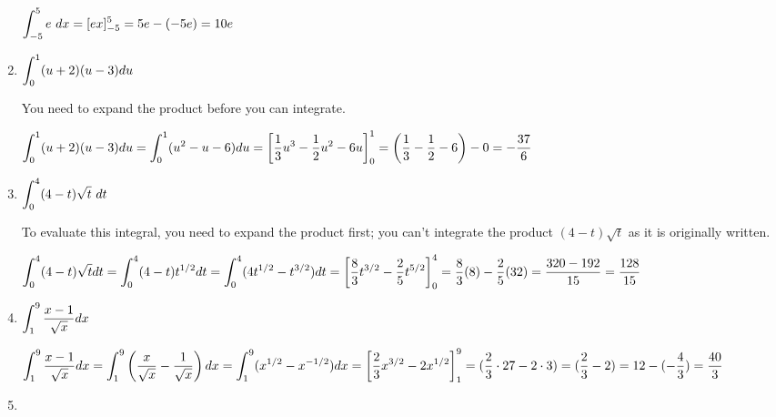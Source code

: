 \begin{enumerate}[1.]
\begin{Solution}
    $\displaystyle \int_{-5}^5 e ~dx = [e x]_{-5}^5 = 5e - (-5e) = 10e$
    
\end{Solution}

\item \begin{Question}
    
  $\displaystyle \int_0^1 (u + 2)(u - 3) du$
\end{Question}

\begin{Solution}
  You need to expand the product before you can integrate.  

    $\displaystyle \int_0^1 (u + 2)(u - 3) du = \int_0^1 (u^2 - u - 6) du = \left[
      \frac{1}{3} u^3 - \frac{1}{2} u^2 - 6u \right]_0^1 =
    \left(\frac{1}{3} - \frac{1}{2} - 6 \right) - 0 = - \frac{37}{6}$
\end{Solution}


  \item \begin{Question}
  $\displaystyle \int_0^4 (4 - t) \sqrt{t} ~dt$
\end{Question}

\begin{Solution}
To evaluate this integral, you need to expand the product first; you can't integrate the product $(4-t)\sqrt{t}$ as it is originally written.

  $\displaystyle \int_0^4 (4 - t) \sqrt{t} dt = \int_0^4 (4 - t) t^{1 / 2} dt =
    \int_0^4 (4t^{1 / 2} - t^{3 / 2}) dt = 
    \left[ \frac{8}{3} t^{3 / 2} - \frac{2}{5} t^{5 / 2} \right]_0^4 =
    \frac{8}{3} (8) - \frac{2}{5} (32) = 
    \frac{320 - 192}{15} = \frac{128}{15}$
\end{Solution}

\item \begin{Question}
    
  $\displaystyle \int_1^9 \frac{x - 1}{\sqrt{x}} dx$
\end{Question}

\begin{Solution}
    
  $\displaystyle \int_1^9 \frac{x - 1}{\sqrt{x}} dx =
    \int_1^9 \left( \frac{x}{\sqrt{x}} - \frac{1}{\sqrt{x}} \right) dx
    = \int_1^9 (x^{1 / 2} - x^{-1 / 2}) dx =
    \left[\frac{2}{3} x^{3 / 2} - 2x^{1 / 2} \right]_1^9 = 
    (\frac{2}{3} \cdot 27 - 2 \cdot 3) = (\frac{2}{3} - 2) = 
    12 - (- \frac{4}{3}) = \frac{40}{3}$
\end{Solution}

\item \begin{Question}
    

\end{Question}
\end{enumerate}
